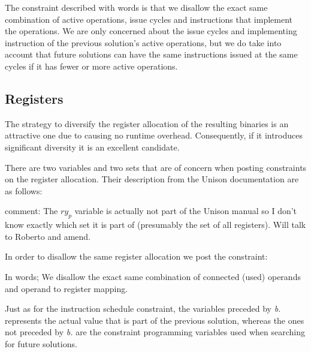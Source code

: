 The constraint described with words is that we disallow the exact same combination of
active operations, issue cycles and instructions that implement the operations. We are
only concerned about the issue cycles and implementing instruction of the previous
solution's active operations, but we do take into account that future solutions can have
the same instructions issued at the same cycles if it has fewer or more active operations.

\subsection{Registers}

The strategy to diversify the register allocation of the resulting binaries is an attractive
one due to causing no runtime overhead. Consequently, if it introduces significant diversity
it is an excellent candidate.

There are two variables and two sets that are of concern when posting constraints on the register
allocation. Their description from the Unison documentation are as follows:

\vspace{0.2cm}

\noindent{}

\vspace{0.2cm}

comment: The $ry_p$ variable is actually not part of the Unison manual so I don't know
exactly which set it is part of (presumably the set of all registers). Will talk to
Roberto and amend.

\vspace{0.2cm}

In order to disallow the same register allocation we post the constraint:

\vspace{0.2cm}
\noindent{}
\vspace{0.2cm}

In words; We disallow the exact same combination of connected (used) operands and
operand to register mapping.

Just as for the instruction schedule constraint, the variables preceded by \textit{b.}
represents the actual value that is part of the previous solution, whereas the ones not
preceded by \textit{b.} are the constraint programming variables used when searching for
future solutions.

